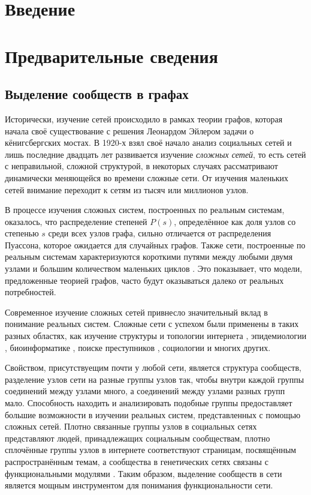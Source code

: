 \section*{Введение}

\section{Предварительные сведения}



\subsection{Выделение сообществ в графах}

Исторически, изучение сетей происходило в рамках теории графов, которая начала своё существование с решения Леонардом Эйлером задачи о кёнигсбергских мостах. В 1920-х взял своё начало анализ социальных сетей и лишь последние двадцать лет развивается изучение \emph{сложных сетей}, то есть сетей с неправильной, сложной структурой, в некоторых случаях рассматривают динамически меняющейся во времени сложные сети. От изучения маленьких сетей внимание переходит к сетям из тысяч или миллионов узлов.

В процессе изучения сложных систем, построенных по реальным системам, оказалось, что распределение степеней $P(s)$, определённое как доля узлов со степенью $s$ среди всех узлов графа, сильно отличается от распределения Пуассона, которое ожидается для случайных графов. Также сети, построенные по реальным системам характеризуются короткими путями между любыми двумя узлами и большим количеством маленьких циклов \cite{Boccaletti&al:2006}. Это показывает, что модели, предложенные теорией графов, часто будут оказываться далеко от реальных потребностей.

Современное изучение сложных сетей привнесло значительный вклад в понимание реальных систем. Сложные сети с успехом были применены в таких разных областях, как изучение структуры и топологии интернета \cite{Faloutsos&al:1999, Broder&al:2000}, эпидемиологии \cite{Moore&Newman:2000}, биоинформатике \cite{Zhao&al:2006}, поиске преступников \cite{Hong&al:2009}, социологии \cite{Scott:2012} и многих других.

Свойством, присутствуещим почти у любой сети, является структура сообществ, разделение узлов сети на разные группы узлов так, чтобы внутри каждой группы соединений между узлами много, а соединений между узлами разных групп мало. Способность находить и анализировать подобные группы предоставляет большие возможности в изучении реальных систем, представленных с помощью сложных сетей. Плотно связанные группы узлов в социальных сетях представляют людей, принадлежащих социальным сообществам, плотно сплочённые группы узлов в интернете соответствуют страницам, посвящённым распространённым темам, а сообщества в генетических сетях связаны с функциональными модулями \cite{Boccaletti&al:2006}. Таким образом, выделение сообществ в сети является мощным инструментом для понимания функциональности сети.


